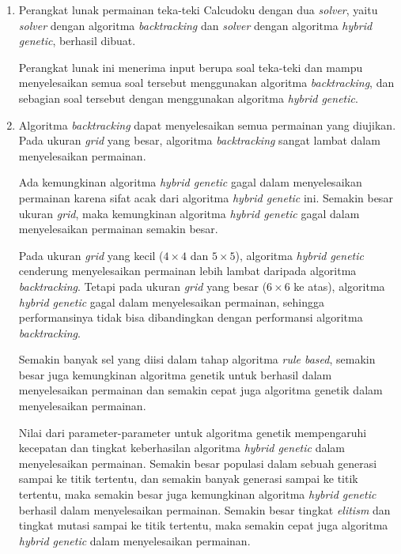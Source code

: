 \begin{enumerate}
\item Perangkat lunak permainan teka-teki Calcudoku dengan dua \textit{solver}, yaitu \textit{solver} dengan algoritma \textit{backtracking} dan \textit{solver} dengan algoritma \textit{hybrid genetic}, berhasil dibuat.

Perangkat lunak ini menerima input berupa soal teka-teki dan mampu menyelesaikan semua soal tersebut menggunakan algoritma \textit{backtracking}, dan sebagian soal tersebut dengan menggunakan algoritma \textit{hybrid genetic}.

\item Algoritma \textit{backtracking} dapat menyelesaikan semua permainan yang diujikan. Pada ukuran \textit{grid} yang besar, algoritma \textit{backtracking} sangat lambat dalam menyelesaikan permainan.

Ada kemungkinan algoritma \textit{hybrid genetic} gagal dalam menyelesaikan permainan karena sifat acak dari algoritma \textit{hybrid genetic} ini. Semakin besar ukuran \textit{grid}, maka kemungkinan algoritma \textit{hybrid genetic} gagal dalam menyelesaikan permainan semakin besar.

Pada ukuran \textit{grid} yang kecil (\begin{math}4 \times 4\end{math} dan \begin{math}5 \times 5\end{math}), algoritma \textit{hybrid genetic} cenderung menyelesaikan permainan lebih lambat daripada algoritma \textit{backtracking}. Tetapi pada ukuran \textit{grid} yang besar (\begin{math}6 \times 6\end{math} ke atas), algoritma \textit{hybrid genetic} gagal dalam menyelesaikan permainan, sehingga performansinya tidak bisa dibandingkan dengan performansi algoritma \textit{backtracking}.

Semakin banyak sel yang diisi dalam tahap algoritma \textit{rule based}, semakin besar juga kemungkinan algoritma genetik untuk berhasil dalam menyelesaikan permainan dan semakin cepat juga algoritma genetik dalam menyelesaikan permainan.

Nilai dari parameter-parameter untuk algoritma genetik mempengaruhi kecepatan dan tingkat keberhasilan algoritma \textit{hybrid genetic} dalam menyelesaikan permainan. Semakin besar populasi dalam sebuah generasi sampai ke titik tertentu, dan semakin banyak generasi sampai ke titik tertentu, maka semakin besar juga kemungkinan algoritma \textit{hybrid genetic} berhasil dalam menyelesaikan permainan. Semakin besar tingkat \textit{elitism} dan tingkat mutasi sampai ke titik tertentu, maka semakin cepat juga algoritma \textit{hybrid genetic} dalam menyelesaikan permainan.
\end{enumerate}

